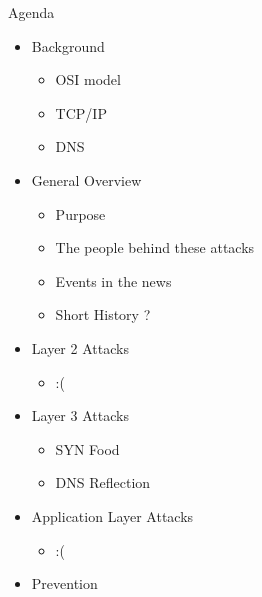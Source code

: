 \documentclass{beamer}
\begin{document}
\begin{frame}{Agenda}
	\begin{itemize}
		\item Background
			\begin{itemize}
				\item OSI model
				\item TCP/IP
				\item DNS
			\end{itemize}
		\item General Overview
			\begin{itemize}
				\item Purpose
				\item The people behind these attacks
				\item Events in the news
				\item Short History ?
			\end{itemize}
		\item Layer 2 Attacks
			\begin{itemize}
				\item :(
			\end{itemize}
		\item Layer 3 Attacks
			\begin{itemize}
				\item{SYN Food}
				\item{DNS Reflection}
			\end{itemize}
		\item Application Layer Attacks
			\begin{itemize}
				\item :(
			\end{itemize}
		\item Prevention
	\end{itemize}
\end{frame}
\end{document}
